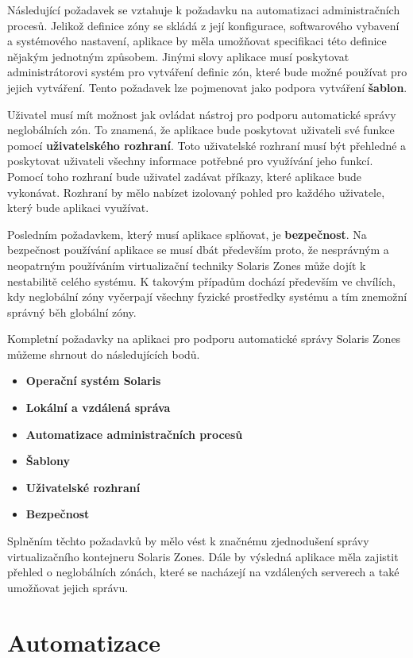 Následující požadavek se vztahuje k požadavku na automatizaci administračních procesů. Jelikož definice zóny se skládá z její
konfigurace, softwarového vybavení a systémového nastavení, aplikace by měla umožňovat specifikaci této definice nějakým 
jednotným způsobem. Jinými slovy aplikace musí poskytovat administrátorovi systém pro vytváření definic zón, které bude možné
používat pro jejich vytváření. Tento požadavek lze pojmenovat jako podpora vytváření \textbf{šablon}.

Uživatel musí mít možnost jak ovládat nástroj pro podporu automatické správy neglobálních zón. To znamená, že aplikace bude
poskytovat uživateli své funkce pomocí \textbf{uživatelského rozhraní}. Toto uživatelské rozhraní musí být přehledné a poskytovat
uživateli všechny informace potřebné pro využívání jeho funkcí. Pomocí toho rozhraní bude uživatel zadávat příkazy, které
aplikace bude vykonávat. Rozhraní by mělo nabízet izolovaný pohled pro každého uživatele, který bude aplikaci využívat.

Posledním požadavkem, který musí aplikace splňovat, je \textbf{bezpečnost}. Na bezpečnost používání aplikace se musí dbát především
proto, že nesprávným a neopatrným používáním virtualizační techniky Solaris Zones může dojít k nestabilitě celého systému.
K takovým případům dochází především ve chvílích, kdy neglobální zóny vyčerpají všechny fyzické prostředky systému a tím
znemožní správný běh globální zóny.

Kompletní požadavky na aplikaci pro podporu automatické správy Solaris Zones můžeme shrnout do následujících bodů.
\begin{itemize}
 \item \textbf{Operační systém Solaris}
 \item \textbf{Lokální a vzdálená správa}
 \item \textbf{Automatizace administračních procesů}
 \item \textbf{Šablony}
 \item \textbf{Uživatelské rozhraní}
 \item \textbf{Bezpečnost}
\end{itemize}
Splněním těchto požadavků by mělo vést k značnému zjednodušení správy virtualizačního kontejneru Solaris Zones. Dále by výsledná
aplikace měla zajistit přehled o neglobálních zónách, které se nacházejí na vzdálených serverech a také umožňovat jejich správu. 
\section{Automatizace}
\label{chapter:design:automation}
